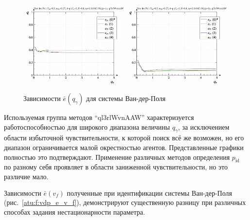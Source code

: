 \begin{figure}[ht!]
\begin{center}
  \includegraphics[width=0.49\textwidth]{p/cha/vdp/vdp_id-p_q_gamma_sign.png}
  \hfill
  \includegraphics[width=0.49\textwidth]{p/cha/vdp/vdp_id-p_q_gamma_sin.png}
\end{center}
  \caption{Зависимости $\bar{e}(q_\gamma)$ для системы Ван-дер-Поля}
\label{atu:f:vdp_e_q_gamma}
\end{figure}

Используемая группа методов ``ql3rlWvnAAW'' характеризуется
работоспособностью для широкого диапазона величины $q_\gamma$,
за исключением области избыточной чувствительности,
к которой поиск всё же возможен, но
его диапазон ограничивается малой окрестностью агентов.
Представленные графики полностью это подтверждают.
Применение различных методов определения $p_\mathrm{id}$
по разному себя проявляет в области заниженной чувствительности,
но это различие мало.


Зависимости $\bar{e}(v_f)$ полученные при идентификации системы Ван-дер-Поля
(рис.~\ref{atu:f:vdp_e_v_f}), демонстрируют
существенную разницу при различных способах
задания нестационарности  параметра.

